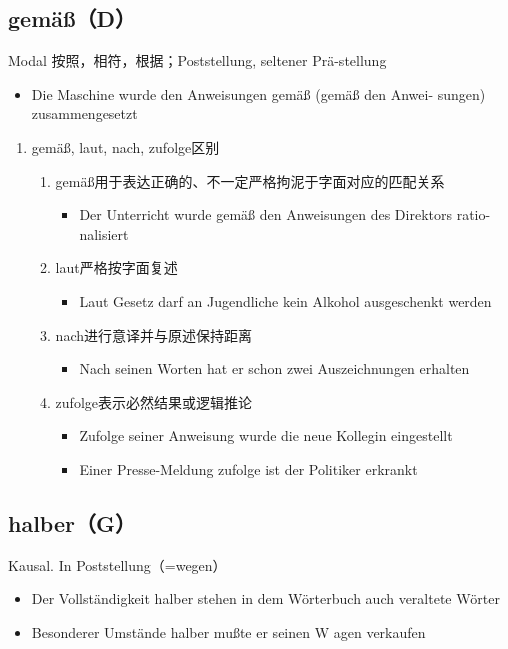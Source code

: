 \documentclass[UTF8]{report}
\begin{document}
\subsection{gemäß（D）}
Modal 按照，相符，根据；Poststellung, seltener Prä-stellung
\begin{itemize}
    \item Die Maschine wurde den Anweisungen gemäß (gemäß den Anwei- sungen) zusammengesetzt
\end{itemize}
\begin{enumerate}
    \item gemäß, laut, nach, zufolge区别
    \begin{enumerate}
        \item gemäß用于表达正确的、不一定严格拘泥于字面对应的匹配关系
        \begin{itemize}
            \item Der Unterricht wurde gemäß den Anweisungen des Direktors ratio- nalisiert
        \end{itemize}
        \item laut严格按字面复述
        \begin{itemize}
            \item Laut Gesetz darf an Jugendliche kein Alkohol ausgeschenkt werden
        \end{itemize}
        \item nach进行意译并与原述保持距离
        \begin{itemize}
            \item Nach seinen Worten hat er schon zwei Auszeichnungen erhalten
        \end{itemize}
        \item zufolge表示必然结果或逻辑推论
        \begin{itemize}
            \item Zufolge seiner Anweisung wurde die neue Kollegin eingestellt
            \item Einer Presse-Meldung zufolge ist der Politiker erkrankt
        \end{itemize}
    \end{enumerate}
\end{enumerate}

\subsection{halber（G）}
Kausal. In Poststellung（=wegen）
\begin{itemize}
    \item Der Vollständigkeit halber stehen in dem Wörterbuch auch veraltete Wörter
    \item Besonderer Umstände halber mußte er seinen W agen verkaufen
\end{itemize}
\end{document}
